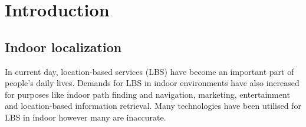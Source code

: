 \documentclass{l4proj}
\begin{document}
\tableofcontents

%
%
%
%
%
%
%
\chapter{Introduction}


\section{Indoor localization}
In current day, location-based services (LBS) have become an important part of people’s daily lives. Demands for LBS in indoor environments have also increased for purposes like indoor path finding and navigation, marketing, entertainment and location-based information retrieval. Many technologies have been utilised for LBS in indoor however many are inaccurate.\\
\end{document}
